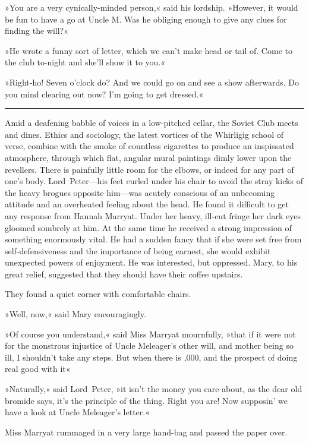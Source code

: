 »You are a very cynically-minded person,« said his lordship. »However, it would be fun to have a go at Uncle M. Was he obliging enough to give any clues for finding the will?«

»He wrote a funny sort of letter, which we can't make head or tail of. Come to the club to-night and she'll show it to you.«

»Right-ho! Seven o'clock do? And we could go on and see a show afterwards. Do you mind clearing out now? I'm going to get dressed.«

\noindent\hfil\rule{0.5\textwidth}{.4pt}\hfil 

Amid a deafening babble of voices in a low-pitched cellar, the Soviet Club meets and dines. Ethics and sociology, the latest vortices of the Whirligig school of verse, combine with the smoke of countless cigarettes to produce an inspissated atmosphere, through which flat, angular mural paintings dimly lower upon the revellers. There is painfully little room for the elbows, or indeed for any part of one's body. Lord~Peter—his feet curled under his chair to avoid the stray kicks of the heavy brogues opposite him—was acutely conscious of an unbecoming attitude and an overheated feeling about the head. He found it difficult to get any response from Hannah Marryat. Under her heavy, ill-cut fringe her dark eyes gloomed sombrely at him. At the same time he received a strong impression of something enormously vital. He had a sudden fancy that if she were set free from self-defensiveness and the importance of being earnest, she would exhibit unexpected powers of enjoyment. He was interested, but oppressed. Mary, to his great relief, suggested that they should have their coffee upstairs.

They found a quiet corner with comfortable chairs.

»Well, now,« said Mary encouragingly.

»Of course you understand,« said Miss Marryat mournfully, »that if it were not for the monstrous injustice of Uncle Meleager's other will, and mother being so ill, I shouldn't take any steps. But when there is ,000, and the prospect of doing real good with it\longdash«

»Naturally,« said Lord~Peter, »it isn't the money you care about, as the dear old bromide says, it's the principle of the thing. Right you are! Now supposin' we have a look at Uncle Meleager's letter.«

Miss Marryat rummaged in a very large hand-bag and passed the paper over.

